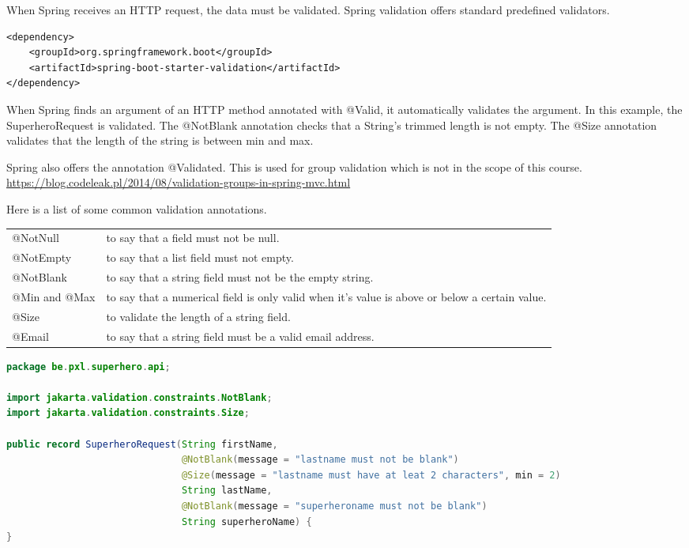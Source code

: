 When Spring receives an HTTP request, the data must be validated. 
Spring validation offers  standard predefined validators.  

\begin{lstlisting}
<dependency>
	<groupId>org.springframework.boot</groupId>
	<artifactId>spring-boot-starter-validation</artifactId>
</dependency>
\end{lstlisting}

When Spring finds an argument of an HTTP method annotated with @Valid, it automatically validates the argument.  In this example, the SuperheroRequest is validated. 
The @NotBlank annotation checks that a String's trimmed length is not empty.
The @Size annotation validates that the length of the string is between min and max.

Spring also offers the annotation @Validated. This is used for group validation which is not in the scope of this course. \url{https://blog.codeleak.pl/2014/08/validation-groups-in-spring-mvc.html}

Here is a list of some common validation annotations.

\begin{tabularx}{\textwidth}{|l|X|}
\hline
@NotNull & to say that a field must not be null. \\
@NotEmpty & to say that a list field must not empty. \\
@NotBlank & to say that a string field must not be the empty string. \\
@Min and @Max & to say that a numerical field is only valid when it’s value is above or below a certain value.\\
@Size & to validate the length of a string field. \\
@Email & to say that a string field must be a valid email address.\\
\hline
\end{tabularx}

\begin{lstlisting}[language=java, frame=single]
package be.pxl.superhero.api;

import jakarta.validation.constraints.NotBlank;
import jakarta.validation.constraints.Size;

public record SuperheroRequest(String firstName,
                               @NotBlank(message = "lastname must not be blank")
                               @Size(message = "lastname must have at leat 2 characters", min = 2)
                               String lastName,
                               @NotBlank(message = "superheroname must not be blank")
                               String superheroName) {
}
\end{lstlisting}

